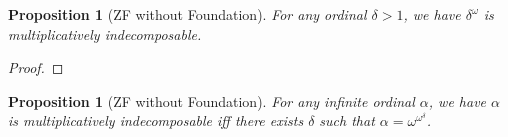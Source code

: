 \documentclass{book}
\let\qed\relax
\newtheorem{prop}[ax]{Proposition}
\theoremstyle{definition}
\begin{document}
\begin{prop}[ZF without Foundation]
For any ordinal $\delta > 1$, we have $\delta^\omega$ is multiplicatively indecomposable.
\end{prop}

\begin{proof}
\pf
{}
\qed
\end{proof}

\begin{prop}[ZF without Foundation]
For any infinite ordinal $\alpha$, we have $\alpha$ is multiplicatively indecomposable iff there exists $\delta$ such that $\alpha = \omega^{\omega^\delta}$.
\end{prop}
\end{document}
